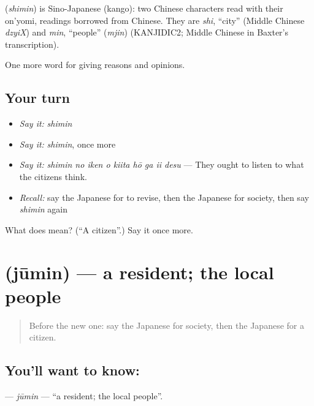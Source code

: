 \begin{cousinweb}
\textbf{} (\emph{shimin}) is Sino-Japanese (kango): two Chinese characters read with their on'yomi, readings borrowed from Chinese. They are \emph{shi}, \textquotedblleft{}city\textquotedblright{} (Middle Chinese \emph{dzyiX}) and \emph{min}, \textquotedblleft{}people\textquotedblright{} (\emph{mjin}) (KANJIDIC2; Middle Chinese in Baxter's transcription).
\end{cousinweb}

\begin{grammarlens}[title={What you've built}]
One more word for giving reasons and opinions.
\end{grammarlens}

\subsection*{Your turn}
\begin{itemize}
\raggedright
  \item \emph{Say it:} \emph{shimin}
  \item \emph{Say it:} \emph{shimin}, once more
  \item \emph{Say it:} \emph{shimin no iken o kiita hō ga ii desu} — They ought to listen to what the citizens think.
  \item \emph{Recall:} say the Japanese for to revise, then the Japanese for society, then say \emph{shimin} again
\end{itemize}

\begin{tcolorbox}[breakable,colback=teal!4,colframe=teal!35!black,title={Before you move on}]
What does  mean? (\textquotedblleft{}A citizen\textquotedblright{}.) Say it once more.
\end{tcolorbox}
\section[\texorpdfstring{\ja{じゅうみん} (jūmin)}{じゅうみん (jūmin)}]{ (jūmin) — a resident; the local people}

\label{lesson:JA-C331-juumin}



\begin{quote}
Before the new one: say the Japanese for society, then the Japanese for a citizen.
\end{quote}

\subsection*{You'll want to know: }
\textbf{} — \emph{jūmin} — \textquotedblleft{}a resident; the local people\textquotedblright{}.

